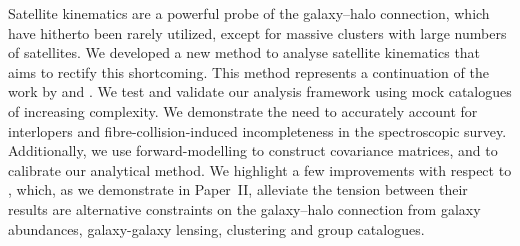 \documentclass[fleqn,usenatbib,useAMS]{mnras}
\begin{document}
	Satellite kinematics are a powerful probe of the galaxy--halo connection, which have hitherto been rarely utilized, except for massive clusters with large numbers of satellites. We developed a new method to analyse satellite kinematics that aims to rectify this shortcoming. This method represents a continuation of the work by \cite{vdBosch+04} and \cite{More+09b, More+09a, More+11}. We test and validate our analysis framework using mock catalogues of increasing complexity. We demonstrate the need to accurately account for interlopers and fibre-collision-induced incompleteness in the spectroscopic survey. Additionally, we use forward-modelling to construct covariance matrices, and to calibrate our analytical method. We highlight a few improvements with respect to \cite{More+11}, which, as we demonstrate in Paper~II, alleviate the tension between their results are alternative constraints on the galaxy--halo connection from galaxy abundances, galaxy-galaxy lensing, clustering and group catalogues.
	
\end{document}
